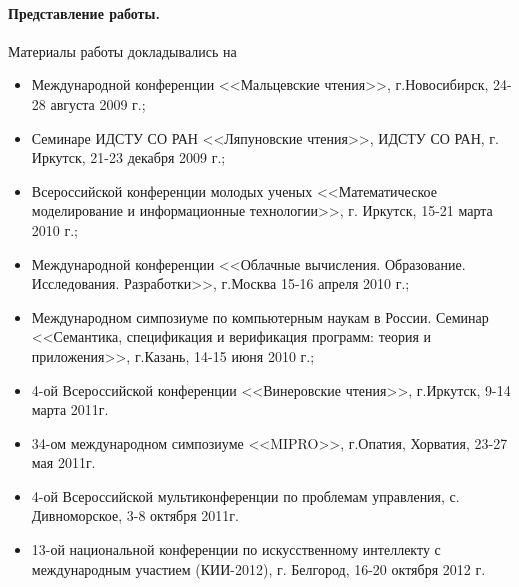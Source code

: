 




\paragraph{Представление работы.} Материалы работы докладывались на
\begin{itemize}
\item Международной конференции <<Мальцевские чтения>>, г.Новосибирск, 24-28 августа 2009 г.;
\item Семинаре ИДСТУ СО РАН <<Ляпуновские чтения>>, ИДСТУ СО РАН, г. Иркутск, 21-23 декабря 2009 г.;
\item Всероссийской конференции молодых ученых <<Математическое моделирование и информационные технологии>>, г. Иркутск, 15-21 марта 2010 г.;
\item Международной конференции <<Облачные вычисления. Образование. Исследования. Разработки>>, г.Москва 15-16 апреля 2010 г.;
\item Международном симпозиуме по компьютерным наукам в России. Семинар <<Семантика, спецификация и верификация программ: теория и приложения>>, г.Казань, 14-15 июня 2010 г.;
\item 4-ой Всероссийской конференции <<Винеровские чтения>>, г.Иркутск, 9-14 марта 2011г.
\item 34-ом международном симпозиуме <<MIPRO>>, г.Опатия, Хорватия, 23-27 мая 2011г.
\item 4-ой Всероссийской мультиконференции по проблемам управления, с. Дивноморское, 3-8 октября 2011г.
\item 13-ой национальной конференции по искусственному интеллекту с международным участием (КИИ-2012), г. Белгород, 16-20 октября 2012 г.
\end{itemize}

